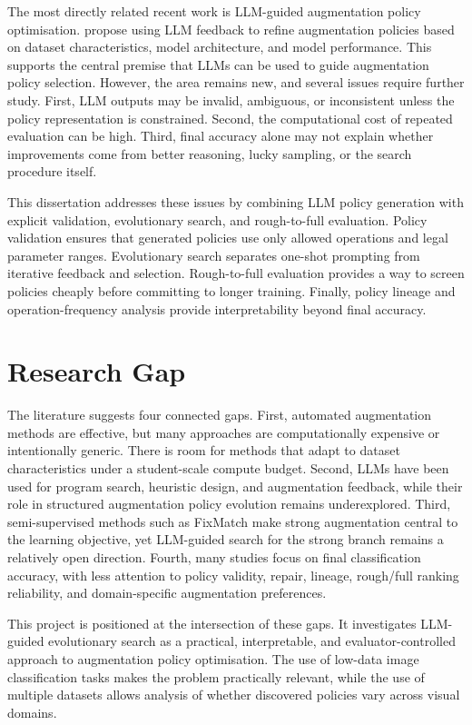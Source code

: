 \documentclass[12pt,a4paper]{report}
\begin{document}
The most directly related recent work is LLM-guided augmentation policy optimisation. \citet{duru2024adaptive} propose using LLM feedback to refine augmentation policies based on dataset characteristics, model architecture, and model performance. This supports the central premise that LLMs can be used to guide augmentation policy selection. However, the area remains new, and several issues require further study. First, LLM outputs may be invalid, ambiguous, or inconsistent unless the policy representation is constrained. Second, the computational cost of repeated evaluation can be high. Third, final accuracy alone may not explain whether improvements come from better reasoning, lucky sampling, or the search procedure itself.

This dissertation addresses these issues by combining LLM policy generation with explicit validation, evolutionary search, and rough-to-full evaluation. Policy validation ensures that generated policies use only allowed operations and legal parameter ranges. Evolutionary search separates one-shot prompting from iterative feedback and selection. Rough-to-full evaluation provides a way to screen policies cheaply before committing to longer training. Finally, policy lineage and operation-frequency analysis provide interpretability beyond final accuracy.

\section{Research Gap}

The literature suggests four connected gaps. First, automated augmentation methods are effective, but many approaches are computationally expensive or intentionally generic. There is room for methods that adapt to dataset characteristics under a student-scale compute budget. Second, LLMs have been used for program search, heuristic design, and augmentation feedback, while their role in structured augmentation policy evolution remains underexplored. Third, semi-supervised methods such as FixMatch make strong augmentation central to the learning objective, yet LLM-guided search for the strong branch remains a relatively open direction. Fourth, many studies focus on final classification accuracy, with less attention to policy validity, repair, lineage, rough/full ranking reliability, and domain-specific augmentation preferences.

This project is positioned at the intersection of these gaps. It investigates LLM-guided evolutionary search as a practical, interpretable, and evaluator-controlled approach to augmentation policy optimisation. The use of low-data image classification tasks makes the problem practically relevant, while the use of multiple datasets allows analysis of whether discovered policies vary across visual domains.
\end{document}
